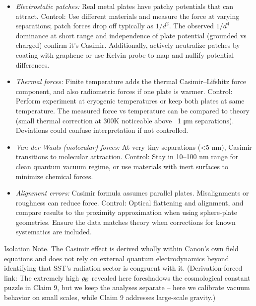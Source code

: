 \documentclass[11pt]{article}
\begin{document}
\begin{itemize}

\item 
\textit{Electrostatic patches:} Real metal plates have patchy potentials that can attract. Control: Use different materials and measure the force at varying separations; patch forces drop off typically as $1/d^2$. The observed $1/d^4$ dominance at short range and independence of plate potential (grounded vs charged) confirm it’s Casimir. Additionally, actively neutralize patches by coating with graphene or use Kelvin probe to map and nullify potential differences.




\item 
\textit{Thermal forces:} Finite temperature adds the thermal Casimir–Lifshitz force component, and also radiometric forces if one plate is warmer. Control: Perform experiment at cryogenic temperatures or keep both plates at same temperature. The measured force vs temperature can be compared to theory (small thermal correction at 300K noticeable above ~1 μm separations). Deviations could confuse interpretation if not controlled.




\item 
\textit{Van der Waals (molecular) forces:} At very tiny separations (<5 nm), Casimir transitions to molecular attraction. Control: Stay in 10–100 nm range for clean quantum vacuum regime, or use materials with inert surfaces to minimize chemical forces.




\item 
\textit{Alignment errors:} Casimir formula assumes parallel plates. Misalignments or roughness can reduce force. Control: Optical flattening and alignment, and compare results to the proximity approximation when using sphere-plate geometries. Ensure the data matches theory when corrections for known systematics are included.




\end{itemize}

Isolation Note. The Casimir effect is derived wholly within Canon’s own field equations and does not rely on external quantum electrodynamics beyond identifying that SST’s radiation sector is congruent with it. (Derivation-forced link: The extremely high $\rho_{\!E}$ revealed here foreshadows the cosmological constant puzzle in Claim 9, but we keep the analyses separate – here we calibrate vacuum behavior on small scales, while Claim 9 addresses large-scale gravity.)
\end{document}
